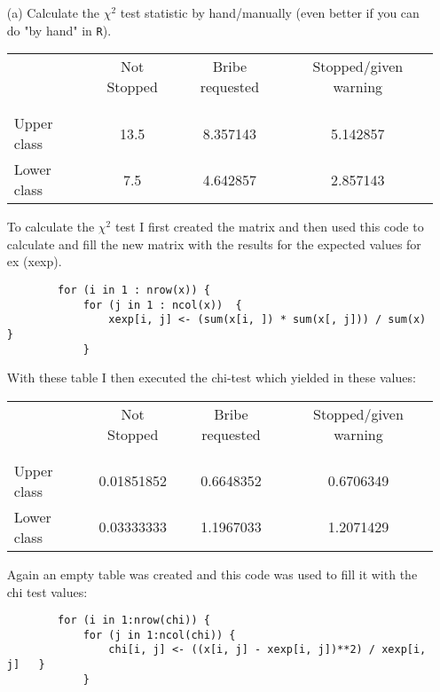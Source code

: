 \documentclass[12pt,letterpaper]{article}
\begin{document}
\begin{enumerate}
	
	\item [(a)]
	Calculate the $\chi^2$ test statistic by hand/manually (even better if you can do "by hand" in \texttt{R}).\\
	
	\begin{table}[h!]
		\centering
		\begin{tabular}{l | c c c }
			& Not Stopped & Bribe requested & Stopped/given warning \\
			\\[-1.8ex] 
			\hline \\[-1.8ex]
			Upper class & 13.5 & 8.357143 & 5.142857 \\
			Lower class & 7.5 & 4.642857 & 2.857143 \\
			\hline
		\end{tabular}
	\end{table}
	
	To calculate the $\chi^2$ test I first created the matrix and then used this code to calculate and fill the new matrix with the results for the expected values for ex (xexp).
	
	\begin{verbatim}
		for (i in 1 : nrow(x)) {  
			for (j in 1 : ncol(x))	{    
				xexp[i, j] <- (sum(x[i, ]) * sum(x[, j])) / sum(x)  }
			}
	\end{verbatim}
	
	With these table I then executed the chi-test which yielded in these values:
		\begin{table}[h!]
		\centering
		\begin{tabular}{l | c c c }
			& Not Stopped & Bribe requested & Stopped/given warning \\
			\\[-1.8ex] 
			\hline \\[-1.8ex]
			Upper class & 0.01851852& 0.6648352 & 0.6706349 \\
			Lower class & 0.03333333 & 1.1967033 & 1.2071429 \\
			\hline
		\end{tabular}
	\end{table}
	
	Again an empty table was created and this code was used to fill it with the chi test values:
	\begin{verbatim}
		for (i in 1:nrow(chi)) {  
			for (j in 1:ncol(chi)) {    
				chi[i, j] <- ((x[i, j] - xexp[i, j])**2) / xexp[i, j]   }
			}
	\end{verbatim}
	

\end{enumerate}
\end{document}

